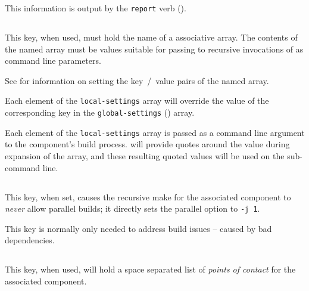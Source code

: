 This information is output by the \texttt{report} verb
().


\subsection{}\label{variables:local-settings}

This key, when used, must hold the name of a \gmsl associative array.
The contents of the named array must be values suitable for passing to
recursive invocations of \make as command line parameters.

See  for information on setting the
key~/~value pairs of the named array.

Each element of the \texttt{local-settings} array will override the
value of the corresponding key in the \texttt{global-settings}
() array.

Each element of the \texttt{local-settings} array is passed as a
command line argument to the component's build process.  \lmsbw will
provide quotes around the value during expansion of the array, and
these resulting quoted values will be used on the sub-\make command
line.


\subsection{}\label{variables:no-parallel}

This key, when set, causes the recursive make for the associated
component to \emph{never} allow parallel builds; it directly sets the
\gnumake parallel option to \texttt{-j 1}.

This key is normally only needed to address build issues -- caused by
bad dependencies.


\subsection{}\label{variables:poc}

This key, when used, will hold a space separated list of \emph{points
  of contact} for the associated component.

